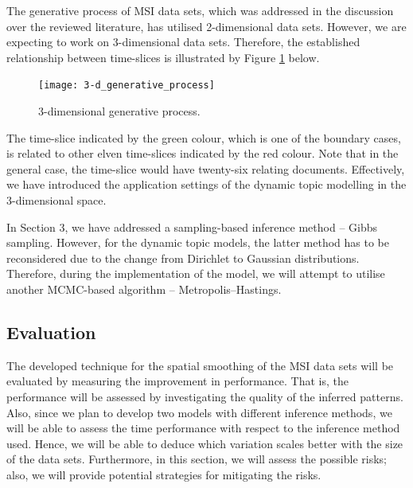 \documentclass{mprop}
\begin{document}
\par The generative process of MSI data sets, which was addressed in the discussion over the reviewed literature, has utilised 2-dimensional data sets. However, we are expecting to work on 3-dimensional data sets. Therefore, the established relationship between time-slices is illustrated by Figure \ref{fig:3-d_generative_process} below.
\begin{figure}[H]
  \centering
  \texttt{[image: 3-d\_generative\_process]}
  \caption{3-dimensional generative process.}
  \label{fig:3-d_generative_process}
\end{figure}
The time-slice indicated by the green colour, which is one of the boundary cases, is related to other elven time-slices indicated by the red colour. Note that in the general case, the time-slice would have twenty-six relating documents. Effectively, we have introduced the application settings of the dynamic topic modelling in the 3-dimensional space.  

\par In Section 3, we have addressed a sampling-based inference method -- Gibbs sampling. However, for the dynamic topic models, the latter method has to be reconsidered due to the change from Dirichlet to Gaussian distributions. Therefore, during the implementation of the model, we will attempt to utilise another MCMC-based algorithm -- Metropolis--Hastings.


\subsection{Evaluation}

\par The developed technique for the spatial smoothing of the MSI data sets will be evaluated by measuring the improvement in performance. That is, the performance will be assessed by investigating the quality of the inferred patterns. Also, since we plan to develop two models with different inference methods, we will be able to assess the time performance with respect to the inference method used. Hence, we will be able to deduce which variation scales better with the size of the data sets. Furthermore, in this section, we will assess the possible risks; also, we will provide potential strategies for mitigating the risks.  
\end{document}

